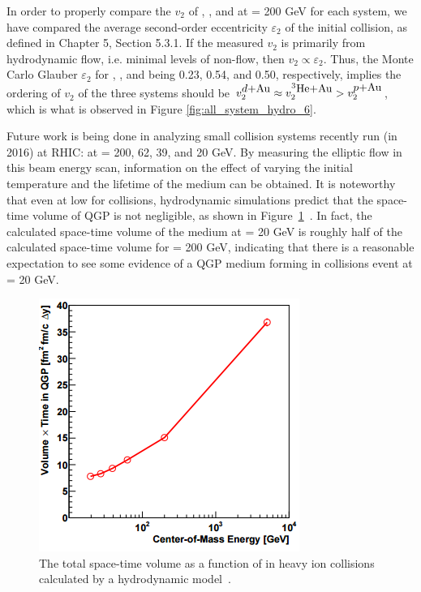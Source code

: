 In order to properly compare the $v_2$ of \pau, \dau, and \hau at \sqsn = 200 GeV for each system, we have compared the average second-order eccentricity $\varepsilon_2$ of the initial collision, as defined in Chapter 5, Section 5.3.1. If the measured $v_2$ is primarily from hydrodynamic flow, i.e. minimal levels of non-flow, then $v_2 \propto \varepsilon_2$. Thus, the Monte Carlo Glauber $\varepsilon_2$ for \pau, \dau, and \hau being 0.23, 0.54, and 0.50, respectively, implies the ordering of $v_2$ of the three systems should be $v_2^{\mbox{$d$+Au}} \approx v_2^{\mbox{$^3\text{He}$+Au}} > v_2^{\mbox{$p$+Au}}$, which is what is observed in Figure \ref{fig:all_system_hydro_6}.

Future work is being done in analyzing small collision systems recently run (in 2016) at RHIC: \dau at \sqsn = 200, 62, 39, and 20 GeV. By measuring the elliptic flow in this \dau beam energy scan, information on the effect of varying the initial temperature and the lifetime of the medium can be obtained. It is noteworthy that even at low \sqsn for \dau collisions, hydrodynamic simulations predict that the space-time volume of QGP is not negligible, as shown in Figure~\ref{fig:size_or_mediumcalc}~\cite{PhysRevC.93.044910}. In fact, the calculated space-time volume of the medium at \sqsn = 20 GeV is roughly half of the calculated space-time volume for \sqsn = 200 GeV, indicating that there is a reasonable expectation to see some evidence of a QGP medium forming in \dau collisions event at \sqsn = 20 GeV.

\begin{figure}[!ht]
\begin{center}
\includegraphics[width=0.5\linewidth]{figs/size_of_medium_calculation.png}
\caption{The total space-time volume as a function of \sqsn in heavy ion collisions calculated by a hydrodynamic model~\cite{PhysRevC.93.044910}.}
\label{fig:size_or_mediumcalc}
\end{center}
\end{figure}

